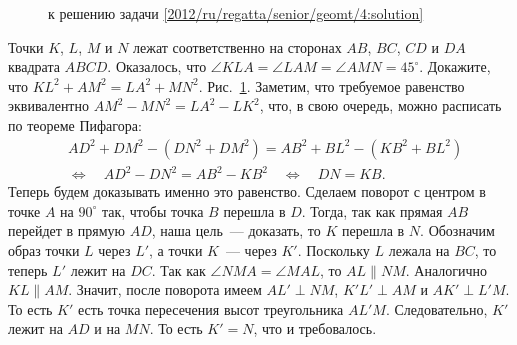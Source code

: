 \ifsolution
\begin{figure}\centering
    \caption{к решению задачи \ref{2012/ru/regatta/senior/geomt/4:solution}}
    \label{2012/ru/regatta/senior/geomt/4:solution:fig}
\end{figure}%
\fi %

\problem
Точки $K$, $L$, $M$ и $N$ лежат соответственно на сторонах
$AB$, $BC$, $CD$ и $DA$ квадрата $ABCD$.
Оказалось, что $\angle KLA = \angle LAM = \angle AMN = 45^\circ$.
Докажите, что $KL^2 + AM^2 = LA^2 + MN^2$.
\solution
\label{2012/ru/regatta/senior/geomt/4:solution}%
Рис.~\ref{2012/ru/regatta/senior/geomt/4:solution:fig}.
Заметим, что требуемое равенство эквивалентно
$AM^2 - MN^2 = LA^2 - LK^2$,
что, в свою очередь, можно расписать по теореме Пифагора:
\begin{align*}
&
    AD^2 + DM^2 - (DN^2 + DM^2) = AB^2 + BL^2 - (KB^2 + BL^2)
\\&\Leftrightarrow\quad
    AD^2 - DN^2 = AB^2 - KB^2
\quad\Leftrightarrow\quad
    DN = KB
.\end{align*}
Теперь будем доказывать именно это равенство.
Сделаем поворот с центром в точке $A$ на $90^\circ$ так, чтобы точка $B$
перешла в $D$.
Тогда, так как прямая $AB$ перейдет в прямую $AD$, наша цель~--- доказать, то
$K$ перешла в $N$.
Обозначим образ точки $L$ через $L'$, а точки $K$~--- через $K'$.
Поскольку $L$ лежала на $BC$, то теперь $L'$ лежит на $DC$.
Так как $\angle NMA = \angle MAL$, то $AL \parallel NM$.
Аналогично $KL \parallel AM$.
Значит, после поворота имеем
$AL' \perp NM$, $K'L' \perp AM$ и $AK' \perp L'M$.
То есть $K'$ есть точка пересечения высот треугольника $AL'M$.
Следовательно, $K'$ лежит на $AD$ и на $MN$.
То есть $K' = N$, что и требовалось.
\endproblem
